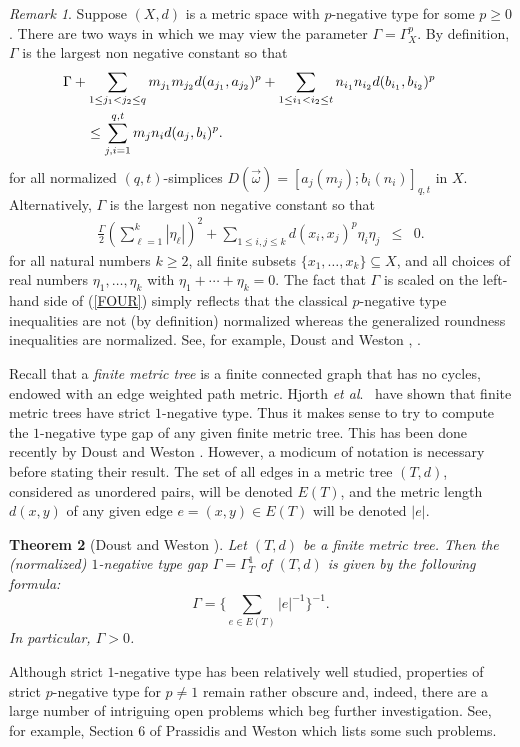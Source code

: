 \documentclass[10pt]{amsart}
\newtheorem{thm}{Theorem}[section]
\theoremstyle{definition}
\theoremstyle{remark}
\newtheorem{rem}[thm]{Remark}
\begin{document}
\begin{rem}
Suppose $(X,d)$ is a metric space with $p$-negative type for some $p \geq 0$. There are two ways in
which we may view the parameter $\Gamma = \Gamma_{X}^{p}$. By definition, $\Gamma$ is the largest non
negative constant so that
\begin{eqnarray}\label{THREE}
\Gamma + \sum\limits_{1 \leq j_{1} < j_{2} \leq q} m_{j_{1}}m_{j_{2}}d(a_{j_{1}},a_{j_{2}})^{p} +
\sum\limits_{1 \leq i_{1} < i_{2} \leq t} n_{i_{1}}n_{i_{2}}d(b_{i_{1}},b_{i_{2}})^{p} & ~ & \\
\leq \sum\limits_{j,i=1}^{q,t} m_{j}n_{i}d(a_{j},b_{i})^{p}. \hspace*{2.11in} & ~ & ~ \nonumber
\end{eqnarray}
for all normalized $(q,t)$-simplices $D(\vec{\omega}) = [a_{j}(m_{j});b_{i}(n_{i})]_{q,t}$ in $X$.
Alternatively, $\Gamma$ is the largest non negative constant so that
\begin{eqnarray}\label{FOUR}
\frac{\Gamma}{2} \left(\sum\limits_{\ell = 1}^{k} |\eta_{\ell}| \right)^{2} +
\sum\limits_{1 \leq i,j \leq k} d(x_{i},x_{j})^{p} \eta_{i} \eta_{j} & \leq & 0.
\end{eqnarray}
for all natural numbers $k \geq 2$,
all finite subsets $\{x_{1}, \ldots , x_{k} \} \subseteq X$, and all choices of real numbers $\eta_{1},
\ldots, \eta_{k}$ with $\eta_{1} + \cdots + \eta_{k} = 0$.
The fact that $\Gamma$ is scaled on the left-hand side of (\ref{FOUR}) simply reflects that the classical
$p$-negative type inequalities are not (by definition) normalized whereas the generalized roundness
inequalities are normalized. See, for example, Doust and Weston \cite{DW}, \cite{DW2}.
\end{rem}

Recall that a \textit{finite metric tree} is a finite connected graph that has no cycles,
endowed with an edge weighted path metric.
Hjorth \textit{et al}.\ \cite{HLM} have shown that
finite metric trees have strict $1$-negative type. Thus it makes sense to try to
compute the $1$-negative type gap of any given finite metric tree. This has been done recently
by Doust and Weston \cite{DW}. However, a modicum of notation is necessary before
stating their result. The set of all edges in a metric tree $(T,d)$,
considered as unordered pairs, will be denoted $E(T)$, and the metric length $d(x,y)$ of any given
edge $e=(x,y) \in E(T)$ will be denoted $|e|$.

\begin{thm}[Doust and Weston \cite{DW}]\label{treegap}
Let $(T,d)$ be a finite metric tree. Then
the (normalized) $1$-negative type gap $\Gamma = \Gamma_{T}^{1}$ of $(T,d)$ is given by the following formula:
\[
\Gamma = \Biggl\{ \sum\limits_{e \in E(T)} |e|^{-1} \Biggl\}^{-1}.
\]
In particular, $\Gamma > 0$.
\end{thm}
\noindent Although strict $1$-negative type has been relatively well studied, properties of strict $p$-negative
type for $p \not= 1$ remain rather obscure and, indeed, there are a large number of intriguing open problems
which beg further investigation. See, for example, Section $6$ of Prassidis and Weston \cite{PW} which lists
some such problems.
\end{document}
